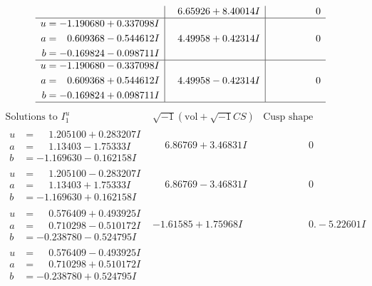 \documentclass[1p]{elsarticle_modified}
\theoremstyle{definition}
\newcommand{\I}{\sqrt{-1}}
\begin{document}
$$\begin{array}{c|c|c}
 & \phantom{-}6.65926 + 8.40014 I & \phantom{-0.000000 } 0 \\ \hline\begin{aligned}
u &= -1.190680 + 0.337098 I \\
a &= \phantom{-}0.609368 - 0.544612 I \\
b &= -0.169824 - 0.098711 I\end{aligned}
 & \phantom{-}4.49958 + 0.42314 I & \phantom{-0.000000 } 0 \\ \hline\begin{aligned}
u &= -1.190680 - 0.337098 I \\
a &= \phantom{-}0.609368 + 0.544612 I \\
b &= -0.169824 + 0.098711 I\end{aligned}
 & \phantom{-}4.49958 - 0.42314 I & \phantom{-0.000000 } 0\\
 \hline 
 \end{array}$$\newpage$$\begin{array}{c|c|c}  
\text{Solutions to }I^u_{1}& \I (\text{vol} + \sqrt{-1}CS) & \text{Cusp shape}\\
 \hline 
\begin{aligned}
u &= \phantom{-}1.205100 + 0.283207 I \\
a &= \phantom{-}1.13403 - 1.75333 I \\
b &= -1.169630 - 0.162158 I\end{aligned}
 & \phantom{-}6.86769 + 3.46831 I & \phantom{-0.000000 } 0 \\ \hline\begin{aligned}
u &= \phantom{-}1.205100 - 0.283207 I \\
a &= \phantom{-}1.13403 + 1.75333 I \\
b &= -1.169630 + 0.162158 I\end{aligned}
 & \phantom{-}6.86769 - 3.46831 I & \phantom{-0.000000 } 0 \\ \hline\begin{aligned}
u &= \phantom{-}0.576409 + 0.493925 I \\
a &= \phantom{-}0.710298 - 0.510172 I \\
b &= -0.238780 - 0.524795 I\end{aligned}
 & -1.61585 + 1.75968 I & \phantom{-0.000000 } 0. - 5.22601 I \\ \hline\begin{aligned}
u &= \phantom{-}0.576409 - 0.493925 I \\
a &= \phantom{-}0.710298 + 0.510172 I \\
b &= -0.238780 + 0.524795 I\end{aligned}

\end{array}$$
\end{document}
